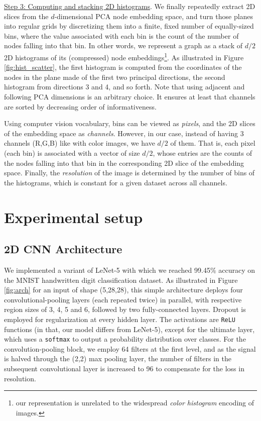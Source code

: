 \documentclass[sigconf]{acmart}
\begin{document}
\vspace{-0.2cm}

\underline{Step 3: Computing and stacking 2D histograms}. We finally repeatedly extract 2D slices from the $d$-dimensional PCA node embedding space, and turn those planes into regular grids by discretizing them into a finite, fixed number of equally-sized bins, where the value associated with each bin is the count of the number of nodes falling into that bin. In other words, we represent a graph as a stack of $d/2$ 2D histograms of its (compressed) node embeddings\footnote{\scriptsize{our representation is unrelated to the widespread \textit{color histogram} encoding of images.}}. As illustrated in Figure \ref{fig:hist_scatter}, the first histogram is computed from the coordinates of the nodes in the plane made of the first two principal directions, the second histogram from directions 3 and 4, and so forth. Note that using adjacent and following PCA dimensions is an arbitrary choice. It ensures at least that channels are sorted by decreasing order of informativeness.

Using computer vision vocabulary, bins can be viewed as \textit{pixels}, and the 2D slices of the embedding space as \textit{channels}. However, in our case, instead of having 3 channels (R,G,B) like with color images,  we have $d/2$ of them. That is, each pixel (each bin) is associated with a vector of size $d/2$, whose entries are the counts of the nodes falling into that bin in the corresponding 2D slice of the embedding space. Finally, the \textit{resolution} of the image is determined by the number of bins of the histograms, which is constant for a given dataset across all channels.

\section{Experimental setup}

\subsection{2D CNN Architecture}
We implemented a variant of LeNet-5 \citep{lecun1998gradient} with which we reached 99.45\% accuracy on the MNIST handwritten digit classification dataset. As illustrated in Figure \ref{fig:arch} for an input of shape (5,28,28), this simple architecture deploys four convolutional-pooling layers (each repeated twice) in parallel, with respective region sizes of 3, 4, 5 and 6, followed by two fully-connected layers. Dropout \citep{srivastava2014dropout} is employed for regularization at every hidden layer. The activations are \texttt{ReLU} functions (in that, our model differs from LeNet-5), except for the ultimate layer, which uses a \texttt{softmax} to output a probability distribution over classes. For the convolution-pooling block, we employ 64 filters at the first level, and as the signal is halved through the (2,2) max pooling layer, the number of filters in the subsequent convolutional layer is increased to 96 to compensate for the loss in resolution.
\end{document}
